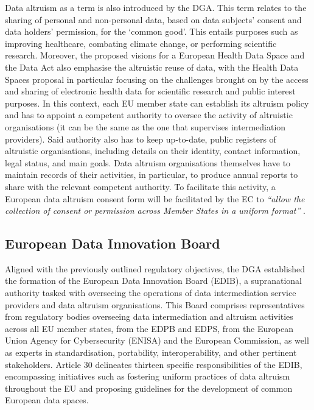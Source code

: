 Data altruism as a term is also introduced by the DGA.
This term relates to the sharing of personal and non-personal data, based on data subjects' consent and data holders' permission, for the `common good'.
This entails purposes such as improving healthcare, combating climate change, or performing scientific research.
Moreover, the proposed visions for a European Health Data Space \citeyearpar{noauthor_proposal_2022} and the Data Act \citeyearpar{noauthor_dataact_2022} also emphasise the altruistic reuse of data, with the Health Data Spaces proposal in particular focusing on the challenges brought on by the access and sharing of electronic health data for scientific research and public interest purposes.
In this context, each EU member state can establish its altruism policy and has to appoint a competent authority to oversee the activity of altruistic organisations (it can be the same as the one that supervises intermediation providers).
Said authority also has to keep up-to-date, public registers of altruistic organisations, including details on their identity, contact information, legal status, and main goals.
Data altruism organisations themselves have to maintain records of their activities, in particular, to produce annual reports to share with the relevant competent authority.
To facilitate this activity, a European data altruism consent form will be facilitated by the EC to \textit{``allow the collection of consent or permission across Member States in a uniform format''} \citeyearpar{noauthor_regulation_2022}.

\subsection{European Data Innovation Board}
\label{sec:edib}

Aligned with the previously outlined regulatory objectives, the DGA established the formation of the European Data Innovation Board (EDIB), a supranational authority tasked with overseeing the operations of data intermediation service providers and data altruism organisations.
This Board comprises representatives from regulatory bodies overseeing data intermediation and altruism activities across all EU member states, from the EDPB and EDPS, from the European Union Agency for Cybersecurity (ENISA) and the European Commission, as well as experts in standardisation, portability, interoperability, and other pertinent stakeholders.
Article 30 \citeyearpar{noauthor_regulation_2022} delineates thirteen specific responsibilities of the EDIB, encompassing initiatives such as fostering uniform practices of data altruism throughout the EU and proposing guidelines for the development of common European data spaces.

